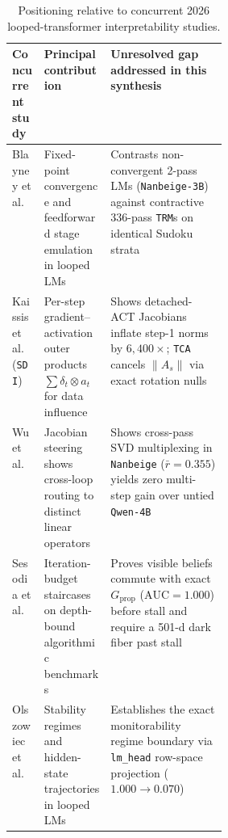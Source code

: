 \documentclass[10pt,letterpaper]{article}
\newcommand{\Gprop}{G_{\mathrm{prop}}}
\begin{document}
\begin{table}[t]
\centering
\small
\begin{tabularx}{\linewidth}{@{}l>{\raggedright\arraybackslash}p{0.31\linewidth}>{\raggedright\arraybackslash}X@{}}
\toprule
Concurrent study & Principal contribution & Unresolved gap addressed in this synthesis \\
\midrule
Blayney et al.\ \cite{blayney2026mechanistic} & Fixed-point convergence and feedforward stage emulation in looped LMs & Contrasts non-convergent 2-pass LMs (\texttt{Nanbeige-3B}) against contractive 336-pass \texttt{TRM}s on identical Sudoku strata \\
Kaissis et al.\ (\texttt{SDI}) \cite{kaissis2026sdi} & Per-step gradient--activation outer products $\sum \delta_t \otimes a_t$ for data influence & Shows detached-ACT Jacobians inflate step-1 norms by $6{,}400\times$; \texttt{TCA} cancels $\|A_s\|$ via exact rotation nulls \\
Wu et al.\ \cite{wu2026shared} & Jacobian steering shows cross-loop routing to distinct linear operators & Shows cross-pass SVD multiplexing in \texttt{Nanbeige} ($\bar{r}=0.355$) yields zero multi-step gain over untied \texttt{Qwen-4B} \\
Sesodia et al.\ \cite{sesodia2026inside} & Iteration-budget staircases on depth-bound algorithmic benchmarks & Proves visible beliefs commute with exact $\Gprop$ ($\mathrm{AUC}=1.000$) before stall and require a 501-d dark fiber past stall \\
Olszowiec et al.\ \cite{olszowiec2026monitoring} & Stability regimes and hidden-state trajectories in looped LMs & Establishes the exact monitorability regime boundary via \texttt{lm\_head} row-space projection ($1.000 \to 0.070$) \\
\bottomrule
\end{tabularx}
\caption{Positioning relative to concurrent 2026 looped-transformer interpretability studies.}
\label{tab:literature}
\end{table}
\end{document}
